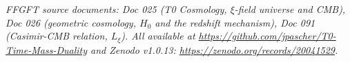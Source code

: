 \documentclass[11pt,a4paper]{article}
\begin{document}
\medskip
\noindent\emph{FFGFT source documents: Doc 025 (T0 Cosmology, $\xi$-field universe and CMB), Doc 026 (geometric cosmology, $H_0$ and the redshift mechanism), Doc 091 (Casimir-CMB relation, $L_\xi$). All available at \url{https://github.com/jpascher/T0-Time-Mass-Duality} and Zenodo v1.0.13: \url{https://zenodo.org/records/20041529}.}
\end{document}
